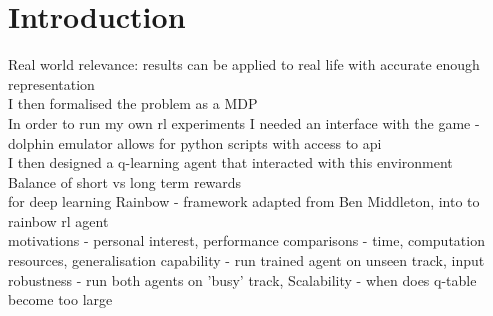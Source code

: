 \chapter*{Introduction}
Real world relevance: results can be applied to real life with accurate enough representation
\\I then formalised the problem as a MDP
\\In order to run my own rl experiments I needed an interface with the game - dolphin emulator allows for python scripts with access to api
\\I then designed a q-learning agent that interacted with this environment
\\ Balance of short vs long term rewards
\\for deep learning Rainbow - framework adapted from Ben Middleton, into to rainbow rl agent
\\motivations - personal interest, performance comparisons - time, computation resources, generalisation capability - run trained agent on unseen track, input robustness - run both agents on 'busy' track, Scalability - when does q-table become too large